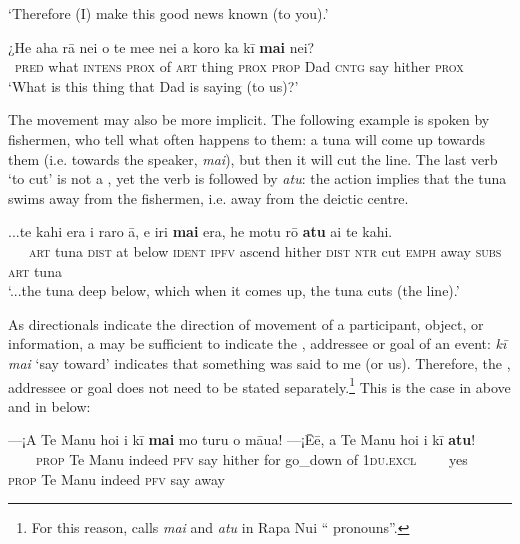 \glt 
‘Therefore (I) make this good news known (to you).’ \textstyleExampleref{[Acts 13:32]}
\z

\ea\label{ex:7.128}
\gll ¿He aha rā nei o te me{\ꞌ}e nei a koro ka kī \textbf{mai} nei? \\
~\textsc{pred} what \textsc{intens} \textsc{prox} of \textsc{art} thing \textsc{prox} \textsc{prop} Dad \textsc{cntg} say hither \textsc{prox} \\

\glt
‘What is this thing that Dad is saying (to us)?’ \textstyleExampleref{[R313.007]} 
\z

The movement may also be more implicit. The following example is spoken by fishermen, who tell what often happens to them: a tuna will come up towards them (i.e. towards the speaker, \textit{mai}), but then it will cut the line. The last verb ‘to cut’ is not a , yet the verb is followed by \textit{atu}: the action implies that the tuna swims away from the fishermen, i.e. away from the deictic centre.

\ea\label{ex:7.129}
\gll ...te kahi era {\ꞌ}i raro {\ꞌ}ā, e iri \textbf{mai} era,  he motu rō \textbf{atu} {\ꞌ}ai te kahi.\\
~~~\textsc{art} tuna \textsc{dist} at below \textsc{ident} \textsc{ipfv} ascend hither \textsc{dist}  \textsc{ntr} cut \textsc{emph} away \textsc{subs} \textsc{art} tuna\\

\glt 
‘...the tuna deep below, which when it comes up, the tuna cuts (the line).’ \textstyleExampleref{[R368.024]} 
\z

As directionals indicate the direction of movement of a participant, object, or information, a  may be sufficient to indicate the , addressee or goal of an event: \textit{kī mai} ‘say toward’ indicates that something was said to me (or us). Therefore, the , addressee or goal does not need to be stated separately.\footnote{\label{fn:351}For this reason, \citet[4]{Wittenstein1978} calls \textit{mai} and \textit{atu} in Rapa Nui “ pronouns”.} This is the case in  above and in  below:

\ea\label{ex:7.130}
\gll —¡A Te Manu ho{\ꞌ}i i kī \textbf{mai} mo turu o māua!  —¡{\ꞌ}Ēē, a Te Manu ho{\ꞌ}i i kī \textbf{atu}!\\
~~~~\textsc{prop} Te Manu indeed  \textsc{pfv} say hither for go\_down of \textsc{1du.excl}  ~~~~yes~~ \textsc{prop} Te Manu indeed \textsc{pfv} say away\\

